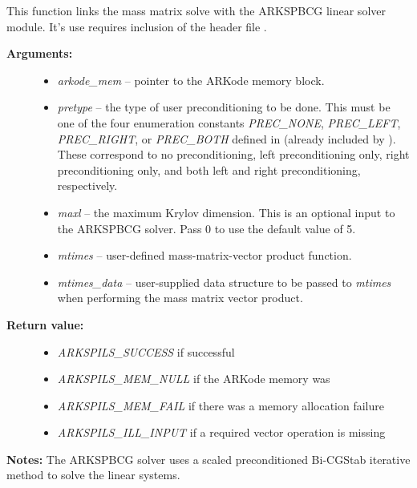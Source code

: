 \documentclass[letterpaper,10pt,english]{sphinxmanual}
\begin{document}

\begin{fulllineitems}
\label{c_interface/User_callable:c.ARKMassSpbcg}
This function links the mass matrix solve with the ARKSPBCG linear
solver module.  It's use requires inclusion of the header file
.
\begin{description}
\item[{\textbf{Arguments:}}] \leavevmode\begin{itemize}
\item {} 
\emph{arkode\_mem} -- pointer to the ARKode memory block.

\item {} 
\emph{pretype} -- the type of user preconditioning to be done.  This
must be one of the four enumeration constants \emph{PREC\_NONE},
\emph{PREC\_LEFT}, \emph{PREC\_RIGHT}, or \emph{PREC\_BOTH} defined in
 (already included by
). These correspond to no preconditioning,
left preconditioning only, right preconditioning only, and
both left and right preconditioning, respectively.

\item {} 
\emph{maxl} -- the maximum Krylov dimension. This is an optional input
to the ARKSPBCG solver. Pass 0 to use the default value of 5.

\item {} 
\emph{mtimes} -- user-defined mass-matrix-vector product function.

\item {} 
\emph{mtimes\_data} -- user-supplied data structure to be passed
to \emph{mtimes} when performing the mass matrix vector product.

\end{itemize}

\item[{\textbf{Return value:}}] \leavevmode\begin{itemize}
\item {} 
\emph{ARKSPILS\_SUCCESS} if successful

\item {} 
\emph{ARKSPILS\_MEM\_NULL}  if the ARKode memory was 

\item {} 
\emph{ARKSPILS\_MEM\_FAIL}  if there was a memory allocation failure

\item {} 
\emph{ARKSPILS\_ILL\_INPUT} if a required vector operation is missing

\end{itemize}

\end{description}

\textbf{Notes:} The ARKSPBCG solver uses a scaled preconditioned Bi-CGStab
iterative method to solve the linear systems.

\end{fulllineitems}
\end{document}
